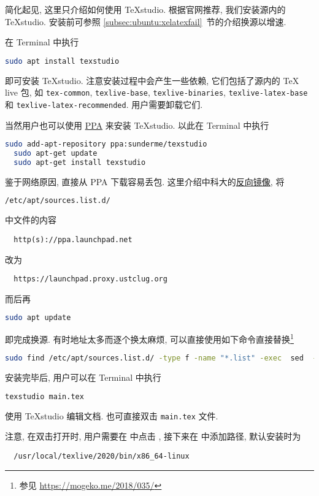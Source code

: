 简化起见, 这里只介绍如何使用 \TeX studio.
根据官网推荐, 我们安装源内的 \TeX studio.
安装前可参照 \ref{subsec:ubuntu:xelatexfail}~节的介绍换源以增速.

在 \textsf{Terminal} 中执行
\begin{lstlisting}[language = bash]
  sudo apt install texstudio
\end{lstlisting}
即可安装 \TeX studio.
注意安装过程中会产生一些依赖, 它们包括了源内的 \TeX{} live 包, 如 \texttt{tex-common}, \texttt{texlive-base}, \texttt{texlive-binaries}, \texttt{texlive-latex-base} 和 \texttt{texlive-latex-recommended}.
用户需要卸载它们.

当然用户也可以使用
\href{https://code.launchpad.net/~sunderme/+archive/ubuntu/texstudio}{PPA}
来安装 \TeX studio.
以此在 \textsf{Terminal} 中执行
\begin{lstlisting}[language = bash]
  sudo add-apt-repository ppa:sunderme/texstudio
  sudo apt-get update
  sudo apt-get install texstudio
\end{lstlisting}
鉴于网络原因,
直接从 PPA 下载容易丢包.
这里介绍中科大的\href{https://lug.ustc.edu.cn/wiki/mirrors/help/revproxy/}{反向镜像},
将
\begin{lstlisting}[language = bash]
  /etc/apt/sources.list.d/
\end{lstlisting}
中文件的内容
\begin{lstlisting}
  http(s)://ppa.launchpad.net
\end{lstlisting}
改为
\begin{lstlisting}
  https://launchpad.proxy.ustclug.org
\end{lstlisting}
而后再
\begin{lstlisting}[language = bash]
  sudo apt update
\end{lstlisting}
即完成换源.
有时地址太多而逐个换太麻烦,
可以直接使用如下命令直接替换\footnote{参见 \url{https://mogeko.me/2018/035/}}
\begin{lstlisting}[language = bash]
  sudo find /etc/apt/sources.list.d/ -type f -name "*.list" -exec  sed  -i.bak -r  's#deb(-src)?\s*http(s)?://ppa.launchpad.net#deb\1 https\2://launchpad.proxy.ustclug.org#ig' {} \;
\end{lstlisting}

安装完毕后,
用户可以在 \textsf{Terminal} 中执行
\begin{lstlisting}[language = bash]
  texstudio main.tex
\end{lstlisting}
使用 \TeX studio 编辑文档.
也可直接双击 \texttt{main.tex} 文件.

注意, 在双击打开时, 用户需要在
 中点击
,
接下来在 
中添加路径,
默认安装时为
\begin{lstlisting}
  /usr/local/texlive/2020/bin/x86_64-linux
\end{lstlisting}

